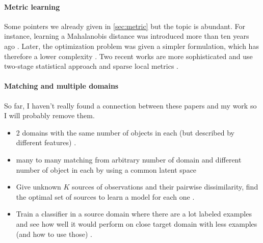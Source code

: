 \paragraph{Metric learning}

Some pointers we already given in \autoref{sec:metric} but the topic is
abundant. For instance, learning a Mahalanobis distance was introduced more
than ten years ago \autocite{Xing2002}. Later, the optimization problem was
given a simpler formulation, which has therefore a lower complexity
\autocite{Shen2011}. Two recent works are more sophisticated and use two-stage
statistical approach \autocite{Wang2014} and sparse local metrics
\autocite{SparseMetric14}.

\paragraph{Matching and multiple domains}

\begin{comments}
	So far, I haven't really found a connection between these papers and my work
	so I will probably remove them.
	\begin{itemize}
		\item 2 domains with the same number of objects in each (but described
			by different features) \autocite{Klami2013}.
		\item many to many matching from arbitrary number of domain and
			different number of object in each by using a common latent space
			\autocite{iwata2013unsupervised}
		\item Give unknown $K$ sources of observations and their pairwise
			dissimilarity, find the optimal set of sources to learn a model
			for each one \autocite{Crammer2008}.
		\item Train a classifier in a source domain where there are a lot
			labeled examples and see how well it would perform on close target
			domain with less examples (and how to use those)
			\autocite{Ben-David2009}.
	\end{itemize}
\end{comments}

